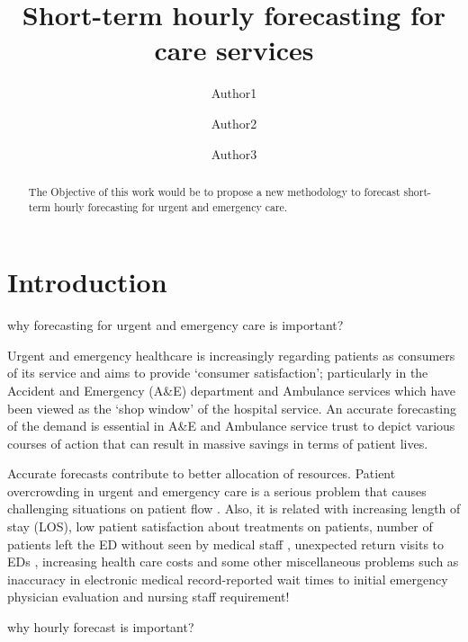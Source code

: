 \documentclass[]{elsarticle} %
\begin{document}
\begin{frontmatter}

  \title{Short-term hourly forecasting for care services}
    \author[University1]{Author1}
    \author[University2]{Author2}
    \author[University3]{Author3}
      \address[University1]{Cardiff business school, 3 Colum Drive, CF10 3EU, Cardiff}
    \address[University2]{adress2}
    \address[University3]{adress3}
  
  \begin{abstract}
  The Objective of this work would be to propose a new methodology to forecast short-term hourly forecasting for urgent and emergency care.
  \end{abstract}
  
 \end{frontmatter}

\hypertarget{introduction}{%
\section{Introduction}\label{introduction}}

why forecasting for urgent and emergency care is important?

Urgent and emergency healthcare is increasingly regarding patients as consumers of its service and aims to provide `consumer satisfaction'; particularly in the Accident and Emergency (A\&E) department and Ambulance services which have been viewed as the `shop window' of the hospital service. An accurate forecasting of the demand is essential in A\&E and Ambulance service trust to depict various courses of action that can result in massive savings in terms of patient lives.

Accurate forecasts contribute to better allocation of resources. Patient overcrowding in urgent and emergency care is a serious problem that causes challenging situations on patient flow . Also, it is related with increasing length of stay (LOS), low patient satisfaction about treatments on patients, number of patients left the ED without seen by medical staff , unexpected return visits to EDs , increasing health care costs and some other miscellaneous problems such as inaccuracy in electronic medical record-reported wait times to initial emergency physician evaluation and nursing staff requirement!

why hourly forecast is important?
\end{document}
